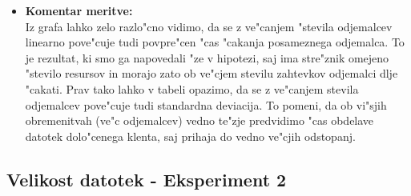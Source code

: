 \begin{itemize}
	\item \textbf{Komentar meritve: } \\ 
		Iz grafa lahko zelo razlo"cno vidimo, da se z ve"canjem "stevila odjemalcev linearno pove"cuje tudi povpre"cen "cas "cakanja posameznega odjemalca. To je rezultat, ki smo ga napovedali "ze v hipotezi, saj ima stre"znik omejeno "stevilo resursov in morajo zato ob ve"cjem stevilu zahtevkov odjemalci dlje "cakati. Prav tako lahko v tabeli opazimo, da se z ve"canjem stevila odjemalcev pove"cuje tudi standardna deviacija. To pomeni, da ob vi"sjih obremenitvah (ve"c odjemalcev) vedno te"zje predvidimo "cas obdelave datotek dolo"cenega klenta, saj prihaja do vedno ve"cjih odstopanj. 


\end{itemize}


\subsection{Velikost datotek - Eksperiment 2}
\label{8_subsec:eksperiment_2}
